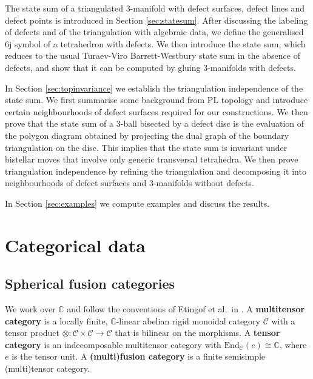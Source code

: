 \documentclass[1.5pt, a4paper]{article}
\newcommand{\C}{\mathbb{C}}
\newcommand{\mac}{\mathcal C}
\newcommand{\End}{\mathrm{End}}
\newcommand{\oo}[0]{\otimes}
\begin{document}
The state sum of a triangulated 3-manifold with defect surfaces, defect lines and defect points is introduced in Section \ref{sec:statesum}.  After discussing the labeling of defects and  of the triangulation with algebraic data, we define the generalised 6j symbol of a tetrahedron with defects. 
We then introduce  the state sum, which  reduces to the usual Turaev-Viro Barrett-Westbury state sum  in the absence of defects, and show that it can be computed by gluing 3-manifolds with defects. 

In Section \ref{sec:topinvariance} we establish the triangulation independence of the state sum. We first summarise some background from PL topology and  introduce certain neighbourhoods of defect surfaces required for our constructions. We then prove that the state sum of a 3-ball bisected by a defect disc is the evaluation of the polygon diagram obtained by projecting the dual graph of the boundary triangulation on the disc.  This implies  that the state sum is invariant under bistellar moves that involve only generic transversal tetrahedra. We then prove triangulation independence by refining the triangulation  and decomposing it into neighbourhoods of defect surfaces and  3-manifolds without defects. 

In Section \ref{sec:examples} we compute examples and discuss the results. 

 

\section{Categorical data}
\label{sec:catbackground}

\subsection{Spherical fusion categories}
We work over $\C$ and follow the conventions of Etingof et al.~in \cite{EGNO}. 
A {\bf multitensor category} is a  locally finite, $\C$-linear abelian rigid monoidal category  $\mac$ with a tensor product $\oo:\mac\times\mac\to \mac$  that is bilinear on the morphisms.  A {\bf tensor category} is an  indecomposable multitensor category
 with $\End_\mac(e)\cong \C$, where $e$ is the tensor unit.
A {\bf (multi)fusion category} is a finite semisimple (multi)tensor category.  
\end{document}
